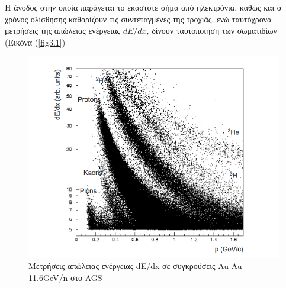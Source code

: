 		
	Η άνοδος στην οποία παράγεται το εκάστοτε σήμα από ηλεκτρόνια, καθώς και ο χρόνος ολίσθησης καθορίζουν τις συντεταγμένες της τροχιάς, ενώ ταυτόχρονα μετρήσεις της απώλειας ενέργειας $dE/dx$, δίνουν ταυτοποιήση των σωματιδίων (Εικόνα (\ref{fig3.1}) 
	
	\begin{figure}[h!]
		\centering 
		\includegraphics[scale=0.5]{STAR_Detectors/SDD_dedx}
		\caption{Μετρήσεις απώλειας ενέργειας dE/dx σε συγκρούσεις Au-Au 11.6GeV/n στο AGS}
		\label{fig3.}
	\end{figure}
	
	
	